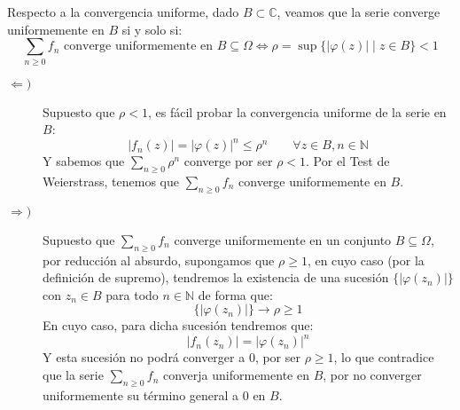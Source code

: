 \documentclass[12pt]{article}
\begin{document}
\begin{ejercicio}[3 puntos]
        Respecto a la convergencia uniforme, dado $B\subset \mathbb{C}$, veamos que la serie converge uniformemente en $B$ si y solo si:
        \begin{equation*}
            \sum_{n\geq 0} f_n \text{\ converge uniformemente en\ } B \subseteq \Omega \Longleftrightarrow \rho = \sup\{|\varphi(z)| \mid z\in B\} < 1
        \end{equation*}
        \begin{description}
            \item [$\Longleftarrow)$] Supuesto que $\rho < 1$, es fácil probar la convergencia uniforme de la serie en $B$:
                \begin{equation*}
                    |f_n(z)| = {|\varphi(z)|}^{n} \leq \rho^n \qquad \forall z\in B, n\in \mathbb{N}
                \end{equation*}
                Y sabemos que $\sum\limits_{n\geq 0}\rho^n$ converge por ser $\rho < 1$. Por el Test de Weierstrass, tenemos que $\sum\limits_{n\geq 0}f_n$ converge uniformemente en $B$.
            \item [$\Longrightarrow)$] Supuesto que $\sum\limits_{n\geq 0}f_n$ converge uniformemente en un conjunto $B\subseteq \Omega$, por reducción al absurdo, supongamos que $\rho \geq 1$, en cuyo caso (por la definición de supremo), tendremos la existencia de una sucesión $\{|\varphi(z_n)|\}$ con $z_n \in B$ para todo $n\in \mathbb{N}$ de forma que:
                \begin{equation*}
                    \{|\varphi(z_n)|\} \to \rho \geq 1
                \end{equation*}
                En cuyo caso, para dicha sucesión tendremos que:
                \begin{equation*}
                    |f_n(z_n)| = {|\varphi(z_n)|}^{n}
                \end{equation*}
                Y esta sucesión no podrá converger a 0, por ser $\rho \geq 1$, lo que contradice que la serie $\sum\limits_{n\geq 0} f_n$ converja uniformemente en $B$, por no converger uniformemente su término general a 0 en $B$.
        \end{description}
    \end{ejercicio}
\end{document}
